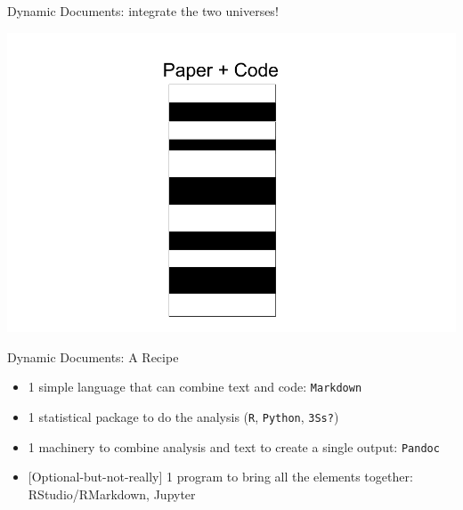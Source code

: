 \documentclass[ignorenonframetext,]{beamer}
\providecommand{\tightlist}{%
  \setlength{\itemsep}{0pt}\setlength{\parskip}{0pt}}
\begin{document}
\begin{frame}{Dynamic Documents: integrate the two universes!}
\protect\hypertarget{dynamic-documents-integrate-the-two-universes}{}

\includegraphics{../Images/One universe.png}

\end{frame}

\begin{frame}[fragile]{Dynamic Documents: A Recipe}
\protect\hypertarget{dynamic-documents-a-recipe}{}

\begin{itemize}
\tightlist
\item
  1 simple language that can combine text and code: \texttt{Markdown}
\item
  1 statistical package to do the analysis (\texttt{R}, \texttt{Python},
  \texttt{3S\textquotesingle{}s?})
\item
  1 machinery to combine analysis and text to create a single output:
  \texttt{Pandoc}
\item
  {[}Optional-but-not-really{]} 1 program to bring all the elements
  together: RStudio/RMarkdown, Jupyter
\end{itemize}

\end{frame}
\end{document}
